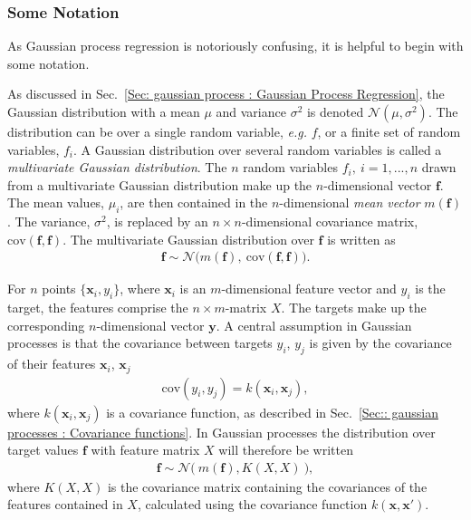 \documentclass[twoside,english]{uiofysmaster}
\begin{document}
{\subsubsection{Some Notation}

As Gaussian process regression is notoriously confusing, it is helpful to begin with some notation. 

As discussed in Sec.~\ref{Sec: gaussian process : Gaussian Process Regression}, the Gaussian distribution with a mean $\mu$ and variance $\sigma^2$ is denoted $\mathcal{N}(\mu, \sigma^2)$. The distribution can be over a single random variable, \textit{e.g.} $f$, or a finite set of random variables, $f_i$. A Gaussian distribution over several random variables is called a \textit{multivariate Gaussian distribution}. The $n$ random variables $f_i, ~i=1,...,n$ drawn from a multivariate Gaussian distribution make up the $n$-dimensional vector $\textbf{f}$. The mean values, $\mu_i$, are then contained in the $n$-dimensional \textit{mean vector} $m(\textbf{f})$. The variance, $\sigma^2$, is replaced by an $n \times n$-dimensional covariance matrix, $\text{cov}(\textbf{f}, \textbf{f})$. The multivariate Gaussian distribution over $\textbf{f}$ is written as
\begin{align}
\textbf{f} \sim \mathcal{N} \big(m(\textbf{f}), ~\text{cov}(\textbf{f},\textbf{f})  \big).
\end{align}  

For $n$ points $\{\textbf{x}_i , y_i\}$, where $\textbf{x}_i$ is an $m$-dimensional feature vector and $y_i$ is the target, the features comprise the $n \times m$-matrix $X$. The targets make up the corresponding $n$-dimensional vector $\textbf{y}$. A central assumption in Gaussian processes is that the covariance between targets $y_i$, $y_j$ is given by the covariance of their features $\textbf{x}_i$, $\textbf{x}_j$
\begin{align}
\text{cov}(y_i, y_j) = k(\textbf{x}_i, \textbf{x}_j),
\end{align}
where $k(\textbf{x}_i, \textbf{x}_j)$ is a covariance function, as described in Sec.~\ref{Sec:: gaussian processes : Covariance functions}. In Gaussian processes the distribution over target values $\textbf{f}$ with feature matrix $X$ will therefore be written
\begin{align}\label{Eq:: gaussian process : Normal distribution GP}
\textbf{f} \sim \mathcal{N} \big(~m( \textbf{f} ), K(X, X) ~\big),
\end{align}
where $K(X,X)$ is the covariance matrix containing the covariances of the features contained in $X$, calculated using the covariance function $k(\textbf{x}, \textbf{x}')$.

}
\end{document}
